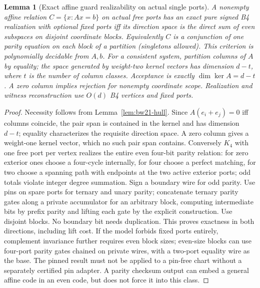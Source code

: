 \documentclass[11pt]{article}
\newtheorem{lemma}[theorem]{Lemma}
\begin{document}
\begin{lemma}[Exact affine guard realizability on actual single ports]\label{lem:bw21-affine}
A nonempty affine relation $C=\{x:Ax=b\}$ on actual free ports has an exact pure signed B4 realization with optional fixed ports iff its direction space is the direct sum of even subspaces on disjoint coordinate blocks. Equivalently $C$ is a conjunction of one parity equation on each block of a partition (singletons allowed). This criterion is polynomially decidable from $A,b$. For a consistent system, partition columns of $A$ by equality; the space generated by weight-two kernel vectors has dimension $d-t$, where $t$ is the number of column classes. Acceptance is exactly $\dim\ker A=d-t$. A zero column implies rejection for nonempty coordinate scope. Realization and witness reconstruction use $O(d)$ B4 vertices and fixed ports.
\end{lemma}
\begin{proof}
Necessity follows from Lemma~\ref{lem:bw21-hull}. Since $A(e_i+e_j)=0$ iff columns coincide, the pair span is contained in the kernel and has dimension $d-t$; equality characterizes the requisite direction space. A zero column gives a weight-one kernel vector, which no such pair span contains. Conversely $K_4$ with one free port per vertex realizes the entire even four-bit parity relation: for zero exterior ones choose a four-cycle internally, for four choose a perfect matching, for two choose a spanning path with endpoints at the two active exterior ports; odd totals violate integer degree summation. Sign a boundary wire for odd parity. Use pins on spare ports for ternary and unary parity; concatenate ternary parity gates along a private accumulator for an arbitrary block, computing intermediate bits by prefix parity and lifting each gate by the explicit construction. Use disjoint blocks. No boundary bit needs duplication. This proves exactness in both directions, including lift cost. If the model forbids fixed ports entirely, complement invariance further requires even block sizes; even-size blocks can use four-port parity gates chained on private wires, with a two-port equality wire as the base. The pinned result must not be applied to a pin-free chart without a separately certified pin adapter. A parity checksum output can embed a general affine code in an even code, but does not force it into this class.
\end{proof}
\end{document}
